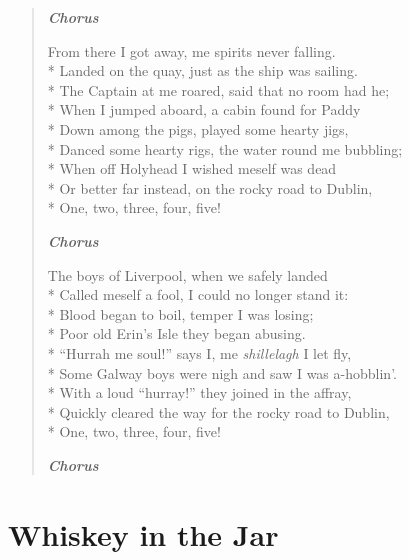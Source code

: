 \documentclass[9pt,twoside]{extarticle}
\newenvironment{xverse}{
	\begin{verse}
	\fontsize{8.5}{10.5}\selectfont
	}
	{
	\end{verse}
	\penalty 0
}
\newcommand{\chorusmark}[1][1]{%
\vspace{-0.5\stanzaskip}%
\textbf{\emph{Chorus \ifthenelse{\equal{#1}{1}}{}{$\times$ #1}}}%
\vspace{-0.5\stanzaskip}%
}
\begin{document}
\begin{xverse}
\chorusmark

From there I got away, me spirits never falling. \\*
Landed on the quay, just as the ship was sailing. \\*
The Captain at me roared, said that no room had he; \\*
When I jumped aboard, a cabin found for Paddy \\*
Down among the pigs, played some hearty jigs, \\*
Danced some hearty rigs, the water round me bubbling; \\*
When off Holyhead I wished meself was dead \\*
Or better far instead, on the rocky road to Dublin, \\*
One, two, three, four, five!

\chorusmark

The boys of Liverpool, when we safely landed \\*
Called meself a fool, I could no longer stand it: \\*
Blood began to boil, temper I was losing; \\*
Poor old Erin’s Isle they began abusing. \\*
“Hurrah me soul!” says I, me \emph{shillelagh} I let fly, \\*
Some Galway boys were nigh and saw I was a-hobblin’. \\*
With a loud “hurray!” they joined in the affray, \\*
Quickly cleared the way for the rocky road to Dublin, \\*
One, two, three, four, five!

\chorusmark[2]
\end{xverse}

\section{Whiskey in the Jar}
\end{document}
